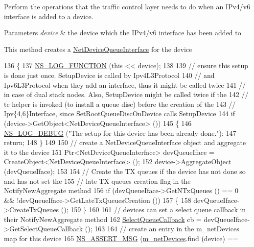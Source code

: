 Perform the operations that the traffic control layer needs to do when an I\+Pv4/v6 interface is added to a device. 


\begin{DoxyParams}{Parameters}
{\em device} & the device which the I\+Pv4/v6 interface has been added to\\
\hline
\end{DoxyParams}
This method creates a \hyperlink{classns3_1_1NetDeviceQueueInterface}{Net\+Device\+Queue\+Interface} for the device 
\begin{DoxyCode}
136 \{
137   \hyperlink{log-macros-disabled_8h_a90b90d5bad1f39cb1b64923ea94c0761}{NS\_LOG\_FUNCTION} (\textcolor{keyword}{this} << device);
138 
139   \textcolor{comment}{// ensure this setup is done just once. SetupDevice is called by Ipv4L3Protocol}
140   \textcolor{comment}{// and Ipv6L3Protocol when they add an interface, thus it might be called twice}
141   \textcolor{comment}{// in case of dual stack nodes. Also, SetupDevice might be called twice if the}
142   \textcolor{comment}{// tc helper is invoked (to install a queue disc) before the creation of the}
143   \textcolor{comment}{// Ipv\{4,6\}Interface, since SetRootQueueDiscOnDevice calls SetupDevice}
144   \textcolor{keywordflow}{if} (device->GetObject<NetDeviceQueueInterface> ())
145     \{
146       \hyperlink{group__logging_ga413f1886406d49f59a6a0a89b77b4d0a}{NS\_LOG\_DEBUG} (\textcolor{stringliteral}{"The setup for this device has been already done."});
147       \textcolor{keywordflow}{return};
148     \}
149 
150   \textcolor{comment}{// create a NetDeviceQueueInterface object and aggregate it to the device}
151   Ptr<NetDeviceQueueInterface> devQueueIface = CreateObject<NetDeviceQueueInterface> ();
152   device->AggregateObject (devQueueIface);
153 
154   \textcolor{comment}{// Create the TX queues if the device has not done so and has not set the}
155   \textcolor{comment}{// late TX queues creation flag in the NotifyNewAggregate method}
156   \textcolor{keywordflow}{if} (devQueueIface->GetNTxQueues () == 0 && !devQueueIface->GetLateTxQueuesCreation ())
157     \{
158       devQueueIface->CreateTxQueues ();
159     \}
160 
161   \textcolor{comment}{// devices can set a select queue callback in their NotifyNewAggregate method}
162   \hyperlink{classns3_1_1TrafficControlLayer_aac192f903f140af92ca59a2d91a4c0cb}{SelectQueueCallback} cb = devQueueIface->GetSelectQueueCallback ();
163 
164   \textcolor{comment}{// create an entry in the m\_netDevices map for this device}
165   \hyperlink{assert_8h_aff5ece9066c74e681e74999856f08539}{NS\_ASSERT\_MSG} (\hyperlink{classns3_1_1TrafficControlLayer_a78320d2a2610f730984ca796ed51a495}{m\_netDevices}.find (device) == 

\end{DoxyCode}

